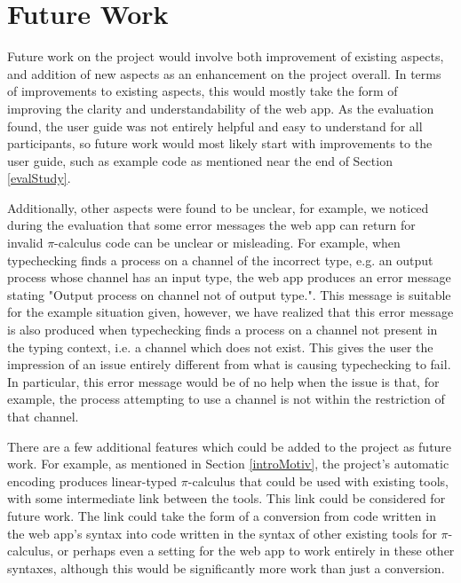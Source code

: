 \documentclass{l4proj}
\begin{document}
\section{Future Work}
\label{concFuture}

\quad Future work on the project would involve both improvement of existing aspects, and addition of new aspects as an enhancement on the project overall. In terms of improvements to existing aspects, this would mostly take the form of improving the clarity and understandability of the web app. As the evaluation found, the user guide was not entirely helpful and easy to understand for all participants, so future work would most likely start with improvements to the user guide, such as example code as mentioned near the end of Section \ref{evalStudy}. 

\quad Additionally, other aspects were found to be unclear, for example, we noticed during the evaluation that some error messages the web app can return for invalid $\pi$-calculus code can be unclear or misleading. For example, when typechecking finds a process on a channel of the incorrect type, e.g. an output process whose channel has an input type, the web app produces an error message stating "Output process on channel not of output type.". This message is suitable for the example situation given, however, we have realized that this error message is also produced when typechecking finds a process on a channel not present in the typing context, i.e. a channel which does not exist. This gives the user the impression of an issue entirely different from what is causing typechecking to fail. In particular, this error message would be of no help when the issue is that, for example, the process attempting to use a channel is not within the restriction of that channel.

\quad There are a few additional features which could be added to the project as future work. For example, as mentioned in Section \ref{introMotiv}, the project's automatic encoding produces linear-typed $\pi$-calculus that could be used with existing tools, with some intermediate link between the tools. This link could be considered for future work. The link could take the form of a conversion from code written in the web app's syntax into code written in the syntax of other existing tools for $\pi$-calculus, or perhaps even a setting for the web app to work entirely in these other syntaxes, although this would be significantly more work than just a conversion.
\end{document}
